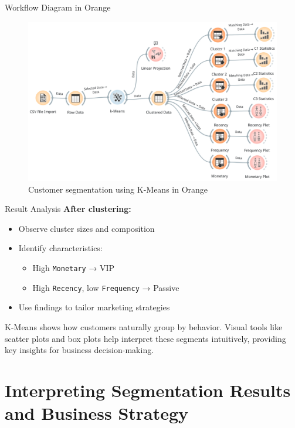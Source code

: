 \documentclass[aspectratio=169, table]{beamer}
\begin{document}
\begin{frame}{Workflow Diagram in Orange}
	\begin{figure}
		\centering
		\includegraphics[width=.9\linewidth]{../../figures/clustering.png}
		\caption{Customer segmentation using K-Means in Orange}
		\label{fig:clustering-orange}
	\end{figure}
\end{frame}


\begin{frame}{Result Analysis}
	\textbf{After clustering:}
	
	\begin{itemize}
		\item Observe cluster sizes and composition
		\item Identify characteristics:
		\begin{itemize}
			\item High \texttt{Monetary} → VIP
			\item High \texttt{Recency}, low \texttt{Frequency} → Passive
		\end{itemize}
		\item Use findings to tailor marketing strategies
	\end{itemize}
	
	K-Means shows how customers naturally group by behavior. Visual tools like scatter plots and box plots help interpret these segments intuitively, providing key insights for business decision-making.
\end{frame}

\section{Interpreting Segmentation Results and Business Strategy}
\end{document}

